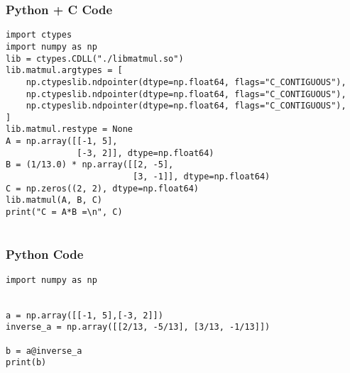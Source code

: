 \documentclass{beamer}
\begin{document}
\begin{frame}[fragile]
    \frametitle{Python + C Code}
    \begin{lstlisting}
import ctypes
import numpy as np
lib = ctypes.CDLL("./libmatmul.so")
lib.matmul.argtypes = [
    np.ctypeslib.ndpointer(dtype=np.float64, flags="C_CONTIGUOUS"), 
    np.ctypeslib.ndpointer(dtype=np.float64, flags="C_CONTIGUOUS"),
    np.ctypeslib.ndpointer(dtype=np.float64, flags="C_CONTIGUOUS"), 
]
lib.matmul.restype = None
A = np.array([[-1, 5],
              [-3, 2]], dtype=np.float64)
B = (1/13.0) * np.array([[2, -5],
                         [3, -1]], dtype=np.float64)
C = np.zeros((2, 2), dtype=np.float64)
lib.matmul(A, B, C)
print("C = A*B =\n", C) 


    \end{lstlisting}
\end{frame}

\begin{frame}[fragile]
    \frametitle{Python Code}
    \begin{lstlisting}
import numpy as np


a = np.array([[-1, 5],[-3, 2]])
inverse_a = np.array([[2/13, -5/13], [3/13, -1/13]])

b = a@inverse_a
print(b)

    \end{lstlisting}
\end{frame}
\end{document}
